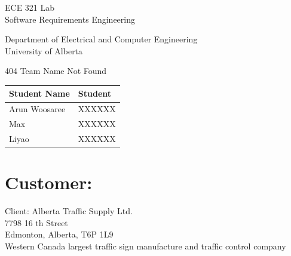 \documentclass[letterpaper]{article}
\begin{document}
\begin{titlepage}
 \begin{center}

  \LARGE
  ECE 321 Lab\\ Software Requirements Engineering

  Department of Electrical and Computer Engineering\\

  University of Alberta

  \vspace{2cm}

  404 Team Name Not Found

  \vspace{5cm}
  \Large

  \begin{tabular}{ | m{5cm} | m{5cm} | }
   \hline
   Student Name  & Student \\
   \hline
   Arun Woosaree & XXXXXX  \\
   \hline
   Max           & XXXXXX  \\
   \hline
   Liyao         & XXXXXX  \\
   \hline
  \end{tabular}




 \end{center}
\end{titlepage}

\tableofcontents
\vfill
\newpage

\section{Customer:}
Client:
Alberta Traffic Supply Ltd.\\
7798 16 th Street\\
Edmonton, Alberta, T6P 1L9\\
Western Canada largest traffic sign manufacture and traffic control company\\
\end{document}

